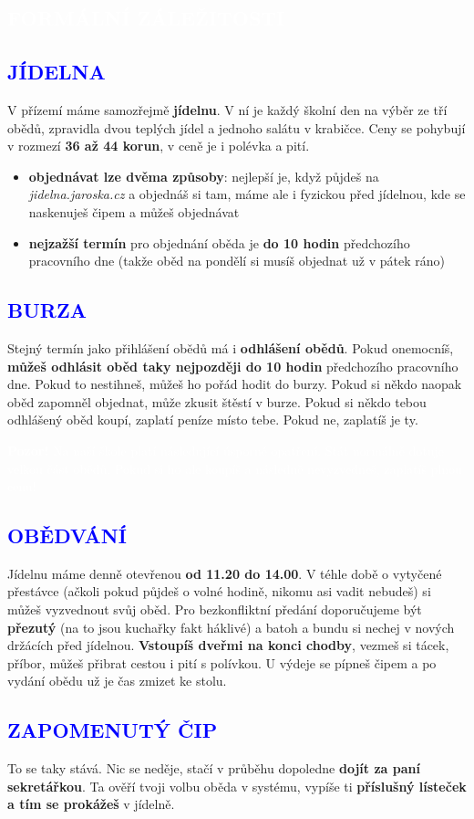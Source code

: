 \documentclass{article}
\newcommand{\nadpisf}[1]{
\vspace*{-60pt}
  \begin{nadpisboxf}
    \vspace*{20pt}
    \centering \section*{\textcolor{white}{#1}}
  \end{nadpisboxf}
}
\newcommand{\podnadpisf}[1]{
  \subsection*{\textcolor{blue}{#1}}
}
\begin{document}
\newpage

\nadpisf{FORMÁLNÍ ZÁLEŽITOSTI}
\noindent \podnadpisf{JÍDELNA}
V přízemí máme samozřejmě \textbf{jídelnu}. V ní je každý školní den na výběr ze tří obědů, zpravidla dvou teplých jídel a jednoho salátu v krabičce. Ceny se pohybují v rozmezí \textbf{36 až 44 korun}, v ceně je i polévka a pití.

\begin{itemize}[leftmargin=10pt]
  \item \textbf{objednávat lze dvěma způsoby}: nejlepší je, když půjdeš na \textit{jidelna.jaroska.cz} a objednáš si tam, máme ale i fyzickou  před jídelnou, kde se naskenuješ čipem a můžeš objednávat
  \item \textbf{nejzažší termín} pro objednání oběda je \textbf{do 10 hodin} předchozího pracovního dne (takže oběd na pondělí si musíš objednat už v pátek ráno)
\end{itemize}

\podnadpisf{BURZA}
Stejný termín jako přihlášení obědů má i \textbf{odhlášení obědů}. Pokud onemocníš, \textbf{můžeš odhlásit oběd taky nejpozději do 10 hodin} předchozího pracovního dne. Pokud to nestihneš, můžeš ho pořád hodit do burzy. Pokud si někdo naopak oběd zapomněl objednat, může zkusit štěstí v burze. Pokud si někdo tebou odhlášený oběd koupí, zaplatí peníze místo tebe. Pokud ne, zaplatíš je ty.

\begin{bluebox}
  \textcolor{white}{
    \textbf{Pozor!} Na naší škole platí následující úsporné opatření. Stát normálně dotuje velkou  část obědů. Pokud si ho ale koupíš a následně nevyzvedneš, zaplatíš plnou cenu!
  }
\end{bluebox}

\podnadpisf{OBĚDVÁNÍ}
Jídelnu máme denně otevřenou \textbf{od 11.20 do 14.00}. V téhle době o vytyčené přestávce (ačkoli pokud půjdeš o volné hodině, nikomu asi vadit nebudeš) si
můžeš vyzvednout svůj oběd. Pro bezkonfliktní předání doporučujeme být \textbf{přezutý} (na to jsou kuchařky fakt háklivé) a batoh a bundu si nechej v nových držácích před jídelnou. \textbf{Vstoupíš dveřmi na konci chodby}, vezmeš si tácek, příbor, můžeš přibrat cestou i pití s polívkou. U výdeje se pípneš čipem a po vydání obědu už je čas zmizet ke stolu.

\podnadpisf{ZAPOMENUTÝ ČIP}
To se taky stává. Nic se neděje, stačí v průběhu dopoledne \textbf{dojít za paní
sekretářkou}. Ta ověří tvoji volbu oběda v systému, vypíše ti \textbf{příslušný lísteček
a tím se prokážeš} v jídelně.
\end{document}
